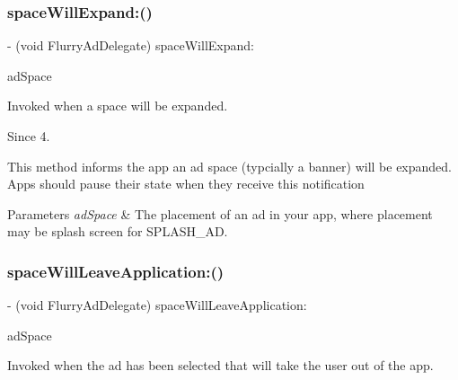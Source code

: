 \subsubsection{\texorpdfstring{space\+Will\+Expand\+:()}{spaceWillExpand:()}}
{\footnotesize\ttfamily -\/ (void Flurry\+Ad\+Delegate) space\+Will\+Expand\+: \begin{DoxyParamCaption}\item[{(N\+S\+String $\ast$)}]{ad\+Space }\end{DoxyParamCaption}\hspace{0.3cm}{\ttfamily [optional]}}



Invoked when a space will be expanded. 

\begin{DoxySince}{Since}
4.
\end{DoxySince}
This method informs the app an ad space (typcially a banner) will be expanded. Apps should pause their state when they receive this notification


\begin{DoxyParams}{Parameters}
{\em ad\+Space} & The placement of an ad in your app, where placement may be splash screen for S\+P\+L\+A\+S\+H\+\_\+\+AD. \\
\hline
\end{DoxyParams}
\mbox{\label{protocolFlurryAdDelegate_01-p_a910cb5e909faea49101305a5740ecccb}} 
\subsubsection{\texorpdfstring{space\+Will\+Leave\+Application\+:()}{spaceWillLeaveApplication:()}}
{\footnotesize\ttfamily -\/ (void Flurry\+Ad\+Delegate) space\+Will\+Leave\+Application\+: \begin{DoxyParamCaption}\item[{(N\+S\+String $\ast$)}]{ad\+Space }\end{DoxyParamCaption}\hspace{0.3cm}{\ttfamily [optional]}}



Invoked when the ad has been selected that will take the user out of the app. 

